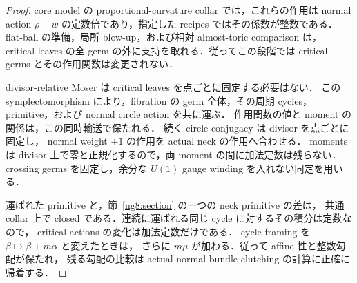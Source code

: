 \begin{proof}
core model の proportional-curvature collar では，これらの作用は
normal action $\rho-w$ の定数倍であり，指定した recipes ではその係数が整数である．
flat-ball の準備，局所 blow-up，および相対 almost-toric comparison は，
critical leaves の全 germ の外に支持を取れる．従ってこの段階では
critical germs とその作用関数は変更されない\cite[Theorem~1.1]{CGblowup}．

divisor-relative Moser は critical leaves を点ごとに固定する必要はない．
この symplectomorphism により，fibration の germ 全体，その周期 cycles，
primitive，および normal circle action を共に運ぶ．
作用関数の値と moment の関係は，この同時輸送で保たれる．
続く circle conjugacy は divisor を点ごとに固定し，
normal weight $+1$ の作用を actual neck の作用へ合わせる．
moments は divisor 上で零と正規化するので，両 moment の間に加法定数は残らない．
crossing germs を固定し，余分な $U(1)$ gauge winding を入れない同定を用いる．

運ばれた primitive と，節~\ref{ng8:section} の一つの neck primitive の差は，
共通 collar 上で closed である．連続に運ばれる同じ cycle に対するその積分は定数なので，
critical actions の変化は加法定数だけである．
cycle framing を $\beta\mapsto\beta+m\alpha$ と変えたときは，
さらに $m\mu$ が加わる．従って affine 性と整数勾配が保たれ，
残る勾配の比較は actual normal-bundle clutching の計算に正確に帰着する．
\end{proof}

